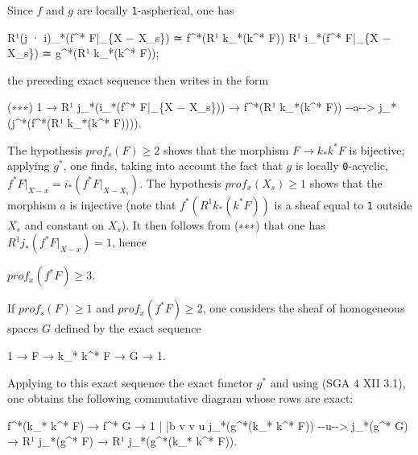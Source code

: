 \documentclass[
  11pt,
  a4paper,
]{book}
\newenvironment{Shaded}{}{}
\newcommand{\NormalTok}[1]{#1}
\begin{document}
Since \(f\) and \(g\) are locally \texttt{1}-aspherical, one has

\begin{Shaded}
\begin{Highlighting}[]
\NormalTok{R¹(j · i)\_*(f\^{}* F|\_\{X − X\_s\}) ≃ f\^{}*(R¹ k\_*(k\^{}* F))}
\NormalTok{R¹ i\_*(f\^{}* F|\_\{X − X\_s\}) ≃ g\^{}*(R¹ k\_*(k\^{}* F));}
\end{Highlighting}
\end{Shaded}

the preceding exact sequence then writes in the form

\begin{Shaded}
\begin{Highlighting}[]
\NormalTok{(∗∗∗)  1 → R¹ j\_*(i\_*(f\^{}* F|\_\{X − X\_s\})) → f\^{}*(R¹ k\_*(k\^{}* F)) {-}{-}a{-}{-}\textgreater{} j\_*(j\^{}*(f\^{}*(R¹ k\_*(k\^{}* F)))).}
\end{Highlighting}
\end{Shaded}

The hypothesis \(prof_{s}(F) \geqslant 2\) shows that the morphism
\(F \to k_{*} k^{*} F\) is bijective; applying \(g^{*}\), one finds,
taking into account the fact that \(g\) is locally \texttt{0}-acyclic,
\(f^{*} F|_{X - {x}} = i_{*}(f^{*} F|_{X -
X_{s}})\). The hypothesis \(prof_{x}(X_{s}) \geqslant 1\) shows that the
morphism \(a\) is injective (note that \(f^{*}(R^{1}
k_{*}(k^{*} F))\) is a sheaf equal to \texttt{1} outside \(X_{s}\) and
constant on \(X_{s}\)). It then follows from (∗∗∗) that one has
\(R^{1} j_{*}(f^{*} F|_{X - {x}}) = 1\), hence

\(prof_{x}(f^{*} F) \geqslant 3\).

If \(prof_{s}(F) \geqslant 1\) and \(prof_{x}(f^{*} F) \geqslant 2\),
one considers the sheaf of homogeneous spaces \(G\) defined by the exact
sequence

\begin{Shaded}
\begin{Highlighting}[]
\NormalTok{1 → F → k\_* k\^{}* F → G → 1.}
\end{Highlighting}
\end{Shaded}

Applying to this exact sequence the exact functor \(g^{*}\) and using
(SGA 4 XII 3.1), one obtains the following commutative diagram whose
rows are exact:

\begin{Shaded}
\begin{Highlighting}[]
\NormalTok{f\^{}*(k\_* k\^{}* F)       →     f\^{}* G                   → 1}
\NormalTok{        |                    |b}
\NormalTok{        v                    v u}
\NormalTok{j\_*(g\^{}*(k\_* k\^{}* F)) {-}{-}u{-}{-}\textgreater{}  j\_*(g\^{}* G)      → R¹ j\_*(g\^{}* F) → R¹ j\_*(g\^{}*(k\_* k\^{}* F)).}
\end{Highlighting}
\end{Shaded}
\end{document}
